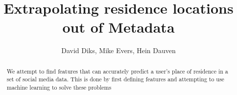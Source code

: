 \documentclass[10pt,a4paper]{article}
\author{David Diks, Mike Evers, Hein Dauven}
\title{Extrapolating residence locations out of Metadata}
\begin{document}
	\maketitle
	
	\begin{abstract}
		We attempt to find features that can accurately predict a user's place of residence in a set of social media data. This is done by first defining features and attempting to use machine learning to solve these problems
	\end{abstract}
	
\end{document}

